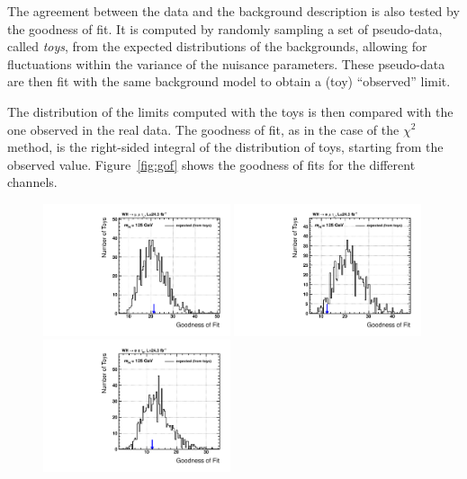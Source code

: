 The agreement between the data and the background description is also tested by the goodness of fit. It is computed by randomly sampling a set of pseudo-data, called \emph{toys}, from the expected distributions of the backgrounds, allowing for fluctuations within the variance of the nuisance parameters. These pseudo-data are then fit with the same background model to obtain a (toy) ``observed'' limit. 

The distribution of the limits computed with the toys is then compared with the one observed in the real data. The goodness of fit, as in the case of the $\chi^2$ method, is the right-sided integral of the distribution of toys, starting from the observed value. Figure~\ref{fig:gof} shows the goodness of fits for the different channels.

\begin{figure}
\begin{center}
  \includegraphics[width=0.49\textwidth]{4_Analisys/pics/GoF/mmt-goodness-of-fit-125.pdf}
  \includegraphics[width=0.49\textwidth]{4_Analisys/pics/GoF/emt-goodness-of-fit-125.pdf}\\
  \includegraphics[width=0.49\textwidth]{4_Analisys/pics/GoF/eet-goodness-of-fit-125.pdf}

\end{center}
\end{figure}
